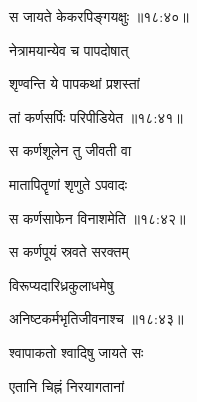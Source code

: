 \nemslokad

{\devanagarifontbold स जायते केकरपिङ्गयक्षुः {॥१८:४०॥} \veg\dontdisplaylinenum }%
 
\ujvers{}

\nemslokab

{\devanagarifontbold नेत्रामयान्येव च पापदोषात्  \danda\dontdisplaylinenum }%
 
\nemslokac

{\devanagarifontbold शृण्वन्ति ये पापकथां प्रशस्तां }%
  \dontdisplaylinenum

\nemslokad

{\devanagarifontbold तां कर्णसर्पिः परिपीडियेत {॥१८:४१॥} \veg\dontdisplaylinenum }%
 
\ujvers{}

\nemslokab

{\devanagarifontbold स कर्णशूलेन तु जीवती वा  \danda\dontdisplaylinenum }%
 
\nemslokac

{\devanagarifontbold मातापितॄणां शृणुते ऽपवादः }%
  \dontdisplaylinenum

\nemslokad

{\devanagarifontbold स कर्णसाफेन विनाशमेति {॥१८:४२॥} \veg\dontdisplaylinenum }%
 
\ujvers{}

\nemslokab

{\devanagarifontbold स कर्णपूयं स्रवते सरक्तम्  \danda\dontdisplaylinenum }%
 
\nemslokac

{\devanagarifontbold विरूप्यदारिध्रकुलाधमेषु }%
  \dontdisplaylinenum

\nemslokad

{\devanagarifontbold अनिष्टकर्मभृतिजीवनाश्च {॥१८:४३॥} \veg\dontdisplaylinenum }%
 
\ujvers{}

\nemslokab

{\devanagarifontbold श्वापाकतो श्वादिषु जायते सः  \danda\dontdisplaylinenum }%
 
\nemslokac

{\devanagarifontbold एतानि चिह्नं निरयागतानां }%
  \dontdisplaylinenum

\nemslokab


